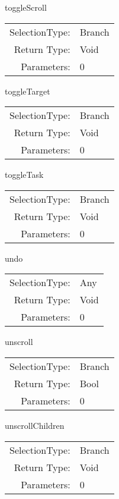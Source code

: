 \item toggleScroll\\
\begin{tabular}{rl}
  SelectionType: & Branch\\
    Return Type: & Void\\
     Parameters: & 0\\
\end{tabular}

\item toggleTarget\\
\begin{tabular}{rl}
  SelectionType: & Branch\\
    Return Type: & Void\\
     Parameters: & 0\\
\end{tabular}

\item toggleTask\\
\begin{tabular}{rl}
  SelectionType: & Branch\\
    Return Type: & Void\\
     Parameters: & 0\\
\end{tabular}

\item undo\\
\begin{tabular}{rl}
  SelectionType: & Any\\
    Return Type: & Void\\
     Parameters: & 0\\
\end{tabular}

\item unscroll\\
\begin{tabular}{rl}
  SelectionType: & Branch\\
    Return Type: & Bool\\
     Parameters: & 0\\
\end{tabular}

\item unscrollChildren\\
\begin{tabular}{rl}
  SelectionType: & Branch\\
    Return Type: & Void\\
     Parameters: & 0\\
\end{tabular}

